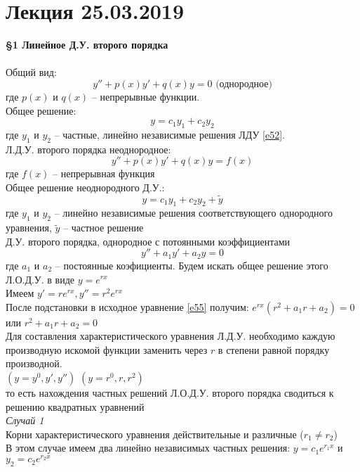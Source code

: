 \documentclass{article}
\numberwithin{equation}{section}
\begin{document}
\section{Лекция 25.03.2019}
\textbf{\large{\S1 Линейное Д.У. второго порядка}}\\\\
Общий вид:
\begin{equation}\label{e52}
y''+p(x)y'+q(x)y=0\mbox{ (однородное)}
\end{equation}
где $p(x)$ и $q(x)$ -- непрерывные функции.\\
Общее решение:
\begin{equation}\label{e53}
y=c_1y_1+c_2y_2
\end{equation}
где $y_1$ и $y_2$ -- частные, линейно независимые решения ЛДУ \eqref{e52}.\\
Л.Д.У. второго порядка неоднородное:
\begin{equation}\label{e54}
y''+p(x)y'+q(x)y=f(x)
\end{equation}
где $f(x)$ -- непрерывная функция\\
Общее решение неоднородного Д.У.:\\
$$y=c_1y_1+c_2y_2+\tilde y$$
где $y_1$ и $y_2$ -- линейно независимые решения соответствующего однородного уравнения, $\tilde y$ -- частное решение\\
Д.У. второго порядка, однородное с потоянными коэффициентами
\begin{equation}\label{e55}
y''+a_1y'+a_2y=0
\end{equation}
где $a_1$ и $a_2$ -- постоянные коэфициенты. Будем искать общее решение этого Л.О.Д.У. в виде $y=e^{rx}$\\
Имеем $y'=re^{rx},y''=r^2e^{rx}$\\
После подстановки в исходное уравнение \eqref{e55} получим: $e^{rx}(r^2+a_1r+a_2)=0$ или $r^2+a_1r+a_2=0$\\
Для составления характеристического уравнения Л.Д.У. необходимо каждую производную искомой функции заменить через $r$ в степени равной порядку производной.\\
$(y=y^0,y',y'')$ $(y=r^0,r,r^2)$\\
то есть нахождения частных решений Л.О.Д.У. второго порядка сводиться к решению квадратных уравнений\\
\textit{Случай 1}\\
Корни характеристического уравнения действительные и различные ($r_1\neq r_2$)\\
В этом случае имеем два линейно независимых частных решения: $y=c_1e^{r_1x}$ и $y_2=c_2e^{r_2x}$\\
\end{document}
